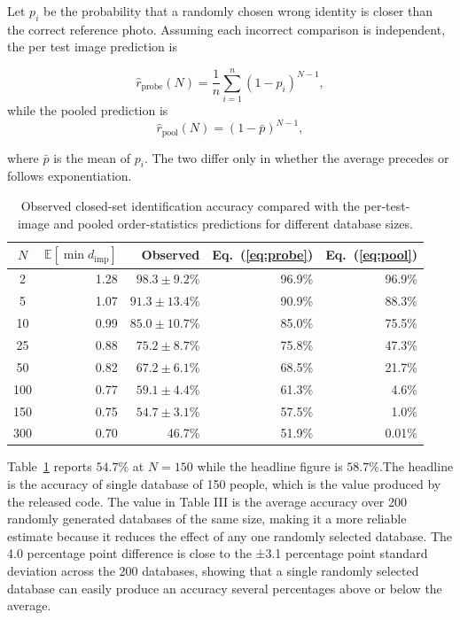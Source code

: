 \documentclass[conference]{IEEEtran}
\begin{document}
Let $p_i$ be the probability that a randomly chosen wrong identity is closer than the correct reference photo. Assuming each incorrect comparison is independent, the per test image prediction is

\begin{equation}
\hat{r}_{\text{probe}}(N) = \frac{1}{n}\sum_{i=1}^{n} (1-p_i)^{N-1},
\label{eq:probe}
\end{equation}
while the pooled prediction is
\begin{equation}
\hat{r}_{\text{pool}}(N) = (1-\bar{p})^{N-1},
\label{eq:pool}
\end{equation}

where $\bar{p}$ is the mean of $p_i$. The two differ only in whether the average
precedes or follows exponentiation.

\begin{table}[!t]
\caption{Observed closed-set identification accuracy compared with the per-test-image and pooled order-statistics predictions for different database sizes.}
\label{tab:orderstats}
\centering
\begin{tabular}{crrrr}
\toprule
$N$ & $\mathbb{E}[\min d_{\text{imp}}]$ & Observed & Eq.~(\ref{eq:probe}) & Eq.~(\ref{eq:pool}) \\
\midrule
2   & 1.28 & $98.3 \pm 9.2$\%  & 96.9\% & 96.9\% \\
5   & 1.07 & $91.3 \pm 13.4$\% & 90.9\% & 88.3\% \\
10  & 0.99 & $85.0 \pm 10.7$\% & 85.0\% & 75.5\% \\
25  & 0.88 & $75.2 \pm 8.7$\%  & 75.8\% & 47.3\% \\
50  & 0.82 & $67.2 \pm 6.1$\%  & 68.5\% & 21.7\% \\
100 & 0.77 & $59.1 \pm 4.4$\%  & 61.3\% & 4.6\% \\
150 & 0.75 & $54.7 \pm 3.1$\%  & 57.5\% & 1.0\% \\
300 & 0.70 & 46.7\%            & 51.9\% & 0.01\% \\
\bottomrule
\end{tabular}
\end{table}

Table~\ref{tab:orderstats} reports $54.7\%$ at
$N=150$ while the headline figure is $58.7\%$.The headline is the accuracy of single database of 150 people, which is the value produced by the released code. The value in Table III is the average accuracy over 200 randomly generated databases of the same size, making it a more reliable estimate because it reduces the effect of any one randomly selected database. The 4.0 percentage point difference is close to the ±3.1 percentage point standard deviation across the 200 databases, showing that a single randomly selected database can easily produce an accuracy several percentages above or below the average.
\end{document}
